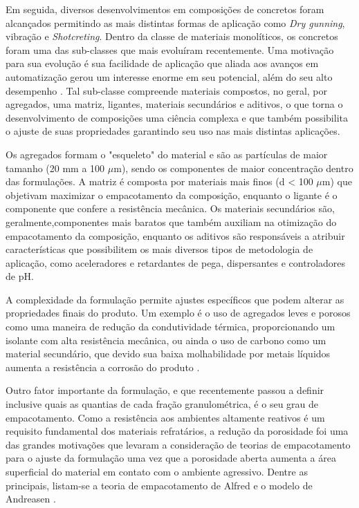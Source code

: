 Em seguida, diversos desenvolvimentos em composições de concretos foram
alcançados permitindo as mais distintas formas de aplicação como \textit{Dry
  gunning}, vibração e \textit{Shotcreting}. Dentro da classe de materiais
monolíticos, os concretos foram uma das sub-classes que mais evoluíram
recentemente. Uma motivação para sua evolução é sua facilidade de aplicação que
aliada aos avanços em automatização gerou um interesse enorme em seu potencial,
além do seu alto desempenho \cite{Schacht2004}. Tal sub-classe compreende
materiais compostos, no geral, por agregados, uma matriz, ligantes, materiais
secundários e aditivos, o que torna o desenvolvimento de composições uma ciência
complexa e que também possibilita o ajuste de suas propriedades garantindo seu
uso nas mais distintas aplicações.
    
Os agregados formam o "esqueleto" do material e são as partículas de maior
tamanho (20 mm a 100 $\mu$m), sendo os componentes de maior
concentração dentro das formulações. A matriz é composta por materiais mais
finos (d < 100 $\mu$m) que objetivam maximizar o empacotamento da composição, enquanto o ligante
é o componente que confere a resistência mecânica. Os materiais secundários são,
geralmente,componentes mais baratos que também auxiliam na otimização do
empacotamento da composição, enquanto os aditivos são responsáveis a atribuir
características que possibilitem os mais diversos tipos de metodologia de
aplicação, como aceleradores e retardantes de pega, dispersantes e controladores
de pH.
    
A complexidade da formulação permite ajustes específicos que podem alterar as
propriedades finais do produto. Um exemplo é o uso de agregados leves e porosos
como uma maneira de redução da condutividade térmica, proporcionando um isolante
com alta resistência mecânica, ou ainda o uso de carbono como um material
secundário, que devido sua baixa molhabilidade por metais líquidos aumenta a
resistência a corrosão do produto \cite{Schacht2004}.
    
Outro fator importante da formulação, e que recentemente passou a definir
inclusive quais as quantias de cada fração granulométrica, é o seu grau de
empacotamento. Como a resistência aos ambientes altamente reativos é um
requisito fundamental dos materiais refratários, a redução da porosidade foi uma
das grandes motivações que levaram a consideração de teorias de empacotamento
para o ajuste da formulação uma vez que a porosidade aberta aumenta a área
superficial do material em contato com o ambiente agressivo. Dentre as
principais, listam-se a teoria de empacotamento de Alfred e o modelo de
Andreasen \cite{Ortega1997}.
    
